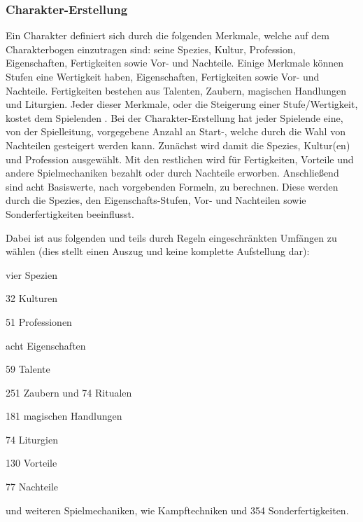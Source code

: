 \subsubsection{Charakter-Erstellung}
\label{subsubsec:charakter-erstellung}

Ein Charakter definiert sich durch die folgenden Merkmale, welche auf dem Charakterbogen einzutragen sind: seine Spezies, Kultur, Profession, Eigenschaften, Fertigkeiten sowie Vor- und Nachteile.
Einige Merkmale können Stufen \bzw eine Wertigkeit haben, \uA Eigenschaften, Fertigkeiten sowie Vor- und Nachteile.
Fertigkeiten bestehen aus Talenten, Zaubern, magischen Handlungen und Liturgien.
Jeder dieser Merkmale, oder die Steigerung einer Stufe/Wertigkeit, kostet dem Spielenden .
Bei der Charakter-Erstellung hat jeder Spielende eine, von der Spielleitung, vorgegebene Anzahl an Start-, welche durch die Wahl von Nachteilen gesteigert werden kann.
Zunächst wird damit die Spezies, Kultur(en) und Profession ausgewählt.
Mit den restlichen  wird für Fertigkeiten, Vorteile und andere Spielmechaniken bezahlt oder durch Nachteile erworben.
Anschließend sind acht Basiswerte, nach vorgebenden Formeln, zu berechnen.
Diese werden \ggfs durch die Spezies, den Eigenschafts-Stufen, Vor- und Nachteilen sowie Sonderfertigkeiten beeinflusst.

Dabei ist aus folgenden und teils durch Regeln eingeschränkten Umfängen zu wählen (dies stellt einen Auszug und keine komplette Aufstellung dar):%
\begin{itemize*}[label={}, itemjoin={,}]%
    \item vier Spezien
    \item 32 Kulturen
    \item 51 Professionen
    \item acht Eigenschaften
    \item 59 Talente
    \item 251 Zaubern und 74 Ritualen
    \item 181 magischen Handlungen
    \item 74 Liturgien
    \item 130 Vorteile
    \item 77 Nachteile
    \item und weiteren Spielmechaniken, wie  Kampftechniken und 354 Sonderfertigkeiten.
\end{itemize*}

